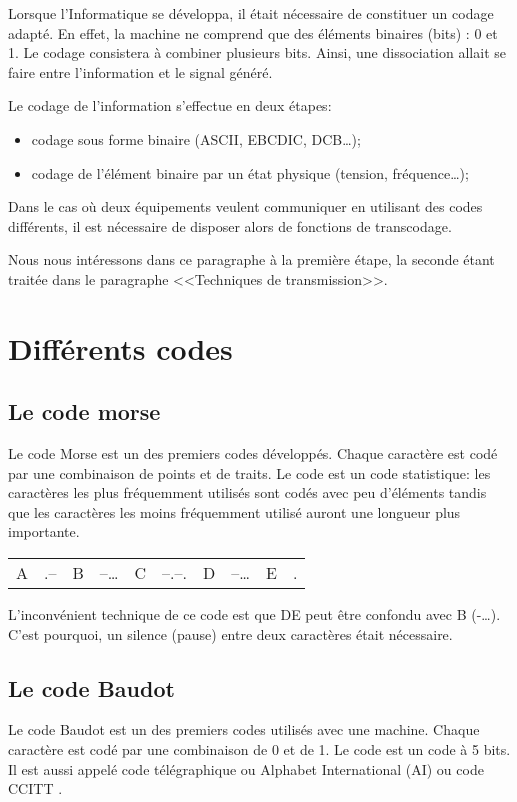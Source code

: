 	Lorsque l'Informatique se développa, il était nécessaire de constituer un codage adapté. En
	effet, la machine ne comprend que des éléments binaires (bits) : 0 et 1. Le codage consistera
	à combiner plusieurs bits. Ainsi, une dissociation allait se faire entre l'information et le
	signal généré.

	Le codage de l'information s'effectue en deux étapes:

	\begin{itemize}
		\item codage sous forme binaire (ASCII, EBCDIC, DCB\ldots);
		\item codage de l'élément binaire par un état physique (tension, fréquence\ldots);
	\end{itemize}

	Dans le cas où deux équipements veulent communiquer en utilisant des codes différents, il est
	nécessaire de disposer alors de fonctions de transcodage.

	Nous nous intéressons dans ce paragraphe à la première étape, la seconde étant traitée dans le
	paragraphe <<Techniques de transmission>>.

	\section{Différents codes}
	\subsection{Le code morse}
	Le code Morse est un des premiers codes développés. Chaque caractère est codé par une
	combinaison de points et de traits. Le code est un code statistique: les caractères les plus
	fréquemment utilisés sont codés avec peu d'éléments tandis que les caractères les moins
	fréquemment utilisé auront une longueur plus importante.

	\begin{tabular}{cccccccccc}
		A&.--&B&--\ldots&C&--.--.&D&--\ldots&E&.
	\end{tabular}

	L'inconvénient technique de ce code est que DE peut être confondu avec B (-\ldots). C'est
	pourquoi, un silence (pause) entre deux caractères était nécessaire.

	\subsection{Le code Baudot}
	Le code Baudot est un des premiers codes utilisés avec une machine. Chaque caractère est codé
	par une combinaison de 0 et de 1. Le code est un code à 5 bits. Il est aussi appelé code
	télégraphique ou Alphabet International (AI)  ou code CCITT .

